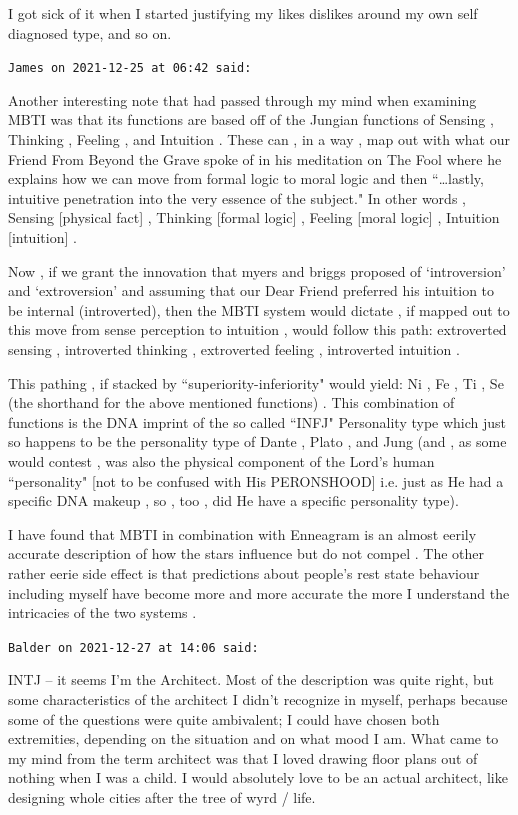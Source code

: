\begin{footnotesize}
\begin{sffamily}
I got sick of it when I started justifying my likes dislikes around my own self diagnosed type, and so on.


\hfill

\texttt{James on 2021-12-25 at 06:42 said: }

Another interesting note that had passed through my mind when examining MBTI was that its functions are based off of the Jungian functions of Sensing , Thinking , Feeling , and Intuition . These can , in a way , map out with what our Friend From Beyond the Grave spoke of in his meditation on The Fool where he explains how we can move from formal logic to moral logic and then ``…lastly, intuitive penetration into the very essence of the subject." In other words , Sensing [physical fact] , Thinking [formal logic] , Feeling [moral logic] , Intuition [intuition] .

Now , if we grant the innovation that myers and briggs proposed of `introversion' and `extroversion' and assuming that our Dear Friend preferred his intuition to be internal (introverted), then the MBTI system would dictate , if mapped out to this move from sense perception to intuition , would follow this path: extroverted sensing , introverted thinking , extroverted feeling , introverted intuition .

This pathing , if stacked by ``superiority-inferiority" would yield: Ni , Fe , Ti , Se (the shorthand for the above mentioned functions) . This combination of functions is the DNA imprint of the so called ``INFJ" Personality type which just so happens to be the personality type of Dante , Plato , and Jung (and , as some would contest , was also the physical component of the Lord's human ``personality" [not to be confused with His PERONSHOOD] i.e. just as He had a specific DNA makeup , so , too , did He have a specific personality type).

I have found that MBTI in combination with Enneagram is an almost eerily accurate description of how the stars influence but do not compel . The other rather eerie side effect is that predictions about people's rest state behaviour including myself have become more and more accurate the more I understand the intricacies of the two systems .


\hfill

\texttt{Balder on 2021-12-27 at 14:06 said: }

INTJ – it seems I'm the Architect. Most of the description was quite right, but some characteristics of the architect I didn't recognize in myself, perhaps because some of the questions were quite ambivalent; I could have chosen both extremities, depending on the situation and on what mood I am. What came to my mind from the term architect was that I loved drawing floor plans out of nothing when I was a child. I would absolutely love to be an actual architect, like designing whole cities after the tree of wyrd / life.


\end{sffamily}\end{footnotesize}

